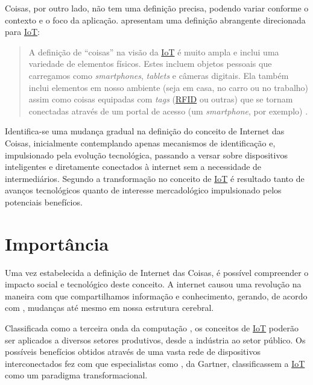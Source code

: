 \documentclass[twoside,english,brazilian]{UNISINOSmonografia}
\begin{document}
	Coisas, por outro lado, não tem uma definição precisa, podendo variar 
	conforme o contexto e o foco da aplicação.  
	apresentam uma definição abrangente direcionada para \hyperref[siglas]{IoT}:
	
	\begin{quote}
		A definição de ``coisas'' na visão da \hyperref[siglas]{IoT} é muito ampla e inclui 
		uma variedade de elementos físicos. Estes incluem objetos pessoais 
		que carregamos como \textit{smartphones}, \textit{tablets} e 
		câmeras digitais. Ela também inclui elementos em nosso ambiente 
		(seja em casa, no carro ou no trabalho) assim como coisas 
		equipadas com \textit{tags} (\hyperref[siglas]{RFID} ou outras) que se tornam 
		conectadas através de um portal de acesso (um \textit{smartphone}, por exemplo)
		\cite{Coetzee2011}.
	\end{quote}
	
	Identifica-se uma mudança gradual na definição do conceito de Internet 
	das Coisas, inicialmente contemplando apenas mecanismos de 
	identificação e, impulsionado pela evolução tecnológica, passando a 
	versar sobre dispositivos inteligentes e diretamente conectados à 
	internet sem a necessidade de intermediários. Segundo 
	 a transformação no conceito de \hyperref[siglas]{IoT} é resultado 
	tanto de avanços tecnológicos quanto de interesse mercadológico 
	impulsionado pelos potenciais benefícios.


\section{Importância}

	Uma vez estabelecida a definição de Internet das Coisas, é possível 
	compreender o impacto social e tecnológico deste conceito. A internet 
	causou uma revolução na maneira com que compartilhamos informação e 
	conhecimento, gerando, de acordo com , mudanças 
	até mesmo em nossa estrutura cerebral.
	
	Classificada como a terceira onda da computação \cite{Register2013}, 
	os conceitos de \hyperref[siglas]{IoT} poderão ser aplicados a diversos setores 
	produtivos, desde a indústria ao setor público. Os possíveis 
	benefícios obtidos através de uma vasta rede de dispositivos 
	interconectados fez com que especialistas como , 
	da Gartner, classificassem a \hyperref[siglas]{IoT} como um paradigma transformacional.
	
\end{document}
